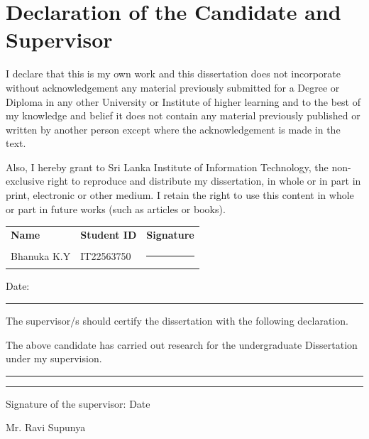 \chapter*{Declaration of the Candidate and Supervisor}

I declare that this is my own work and this dissertation does not incorporate without acknowledgement any material previously submitted for a Degree or Diploma in any other University or Institute of higher learning and to the best of my knowledge and belief it does not contain any material previously published or written by another person except where the acknowledgement is made in the text.

Also, I hereby grant to Sri Lanka Institute of Information Technology, the non-exclusive right to reproduce and distribute my dissertation, in whole or in part in print, electronic or other medium. I retain the right to use this content in whole or part in future works (such as articles or books).

\vspace{1.5cm}

\begin{tabular}{@{}lll@{}}
\textbf{Name} & \textbf{Student ID} & \textbf{Signature} \\[6pt]
Bhanuka K.Y & IT22563750 & \rule{4cm}{0.4pt} \\[6pt]
\end{tabular}

\vspace{0.5cm}
Date: \rule{4cm}{0.4pt}

\vspace{2cm}

The supervisor/s should certify the dissertation with the following declaration.

The above candidate has carried out research for the undergraduate Dissertation under my supervision.

\vspace{1.5cm}

\rule{5cm}{0.4pt} \hfill \rule{4cm}{0.4pt}

Signature of the supervisor: \hfill Date

Mr. Ravi Supunya

\newpage
